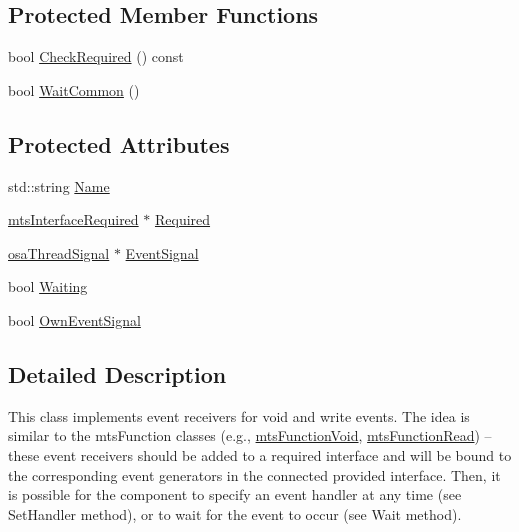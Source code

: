 \subsection*{Protected Member Functions}
\begin{DoxyCompactItemize}
\item 
bool \hyperlink{classmts_event_receiver_base_a3578c0b05513decabb747292174d0d5f}{Check\-Required} () const 
\item 
bool \hyperlink{classmts_event_receiver_base_acf7025608786335eb2113e8a81a9d2dc}{Wait\-Common} ()
\end{DoxyCompactItemize}
\subsection*{Protected Attributes}
\begin{DoxyCompactItemize}
\item 
std\-::string \hyperlink{classmts_event_receiver_base_adfb7eb58f27a2db2bb9bd6b43d50e851}{Name}
\item 
\hyperlink{classmts_interface_required}{mts\-Interface\-Required} $\ast$ \hyperlink{classmts_event_receiver_base_aa614f14ccef40af5bde25c37226d0000}{Required}
\item 
\hyperlink{classosa_thread_signal}{osa\-Thread\-Signal} $\ast$ \hyperlink{classmts_event_receiver_base_a23854ba0cf04b73df856a7f405f30229}{Event\-Signal}
\item 
bool \hyperlink{classmts_event_receiver_base_a962d76302ff233185a6797fed4f7052b}{Waiting}
\item 
bool \hyperlink{classmts_event_receiver_base_a11a6911351875c41dce67ea5b3fb59fd}{Own\-Event\-Signal}
\end{DoxyCompactItemize}


\subsection{Detailed Description}
This class implements event receivers for void and write events. The idea is similar to the mts\-Function classes (e.\-g., \hyperlink{classmts_function_void}{mts\-Function\-Void}, \hyperlink{classmts_function_read}{mts\-Function\-Read}) -- these event receivers should be added to a required interface and will be bound to the corresponding event generators in the connected provided interface. Then, it is possible for the component to specify an event handler at any time (see Set\-Handler method), or to wait for the event to occur (see Wait method).


